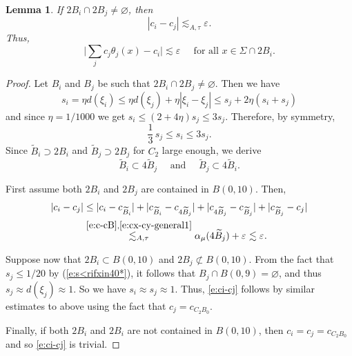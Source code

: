 \documentclass[11pt]{amsart}
\newcommand{\rf}[1]{{(\ref{#1})}}
\newcommand{\ve}{{\varepsilon}}
\newcommand{\wt}[1]{{\widetilde{#1}}}
\newtheorem{lemma}[theorem]{Lemma}
\theoremstyle{definition}
\theoremstyle{remark}
\numberwithin{equation}{section}
\def\lec{\lesssim}
\def\lec{\lesssim}
\begin{document}
\begin{lemma}
	If $2B_{i}\cap 2B_{j}\neq\varnothing$, then
	\begin{equation}
	\label{e:ci-cj}
	|c_{i}-c_{j}|\lec_{A,\tau} \ve^{}.
	\end{equation}
	Thus,
	\begin{equation}\label{e:almost-constant}
	\biggl|\sum_{j}c_{j} \theta_{j}(x)-c_{i}\biggr|\lec \ve^{} \quad\mbox{ for all }x\in \Sigma\cap 2B_{i}. 
	\end{equation}
\end{lemma}

\begin{proof}
Let $B_i$ and $B_j$ be such that $2B_{i}\cap 2B_{j}\neq\varnothing$.
 Then we have
\[
s_{i} = \eta d(\xi_{i}) \leq \eta d(\xi_{j}) + \eta|\xi_{i}-\xi_{j}|
\leq s_{j} + 2\eta (s_{i}+s_{j})
\]
and since $\eta=1/1000$ we get
$
s_{i}\leq (2+4\eta)s_{j} \leq 3s_{j}.
$
Therefore, by symmetry,
$$\frac13\,s_j\leq s_{i}\leq 3s_{j}.$$
Since $ \wt{B}_{i}\supset 2B_i$ and $\wt{B}_{j}\supset 2B_{j}$ for $C_{2}$ large enough, we
derive
\[
 \wt{B}_{i}\subset 4 \wt{B}_{j}\quad \mbox{ and }\quad\wt{B}_{j}\subset 4 \wt{B}_{i}.
\]

First assume both $2B_{i}$ and $2B_{j}$ are contained in $B(0,10)$.
Then,
\begin{align*}
|c_{i}-c_{j}|
& \leq |c_{i} - c_{\wt{B}_{i}}|
+ |c_{\wt{B}_{i}}- c_{4\wt{B}_{j}}|
+|c_{4\wt{B}_{j}}-c_{\wt{B}_{j}}|
+ |c_{\wt{B}_{j}}-c_{j}|\\
& \stackrel{\eqref{e:c-cB}, \eqref{e:cx-cy-general1}}{\lec_{A,\tau}} \alpha_{\mu}(4\wt{B}_{j}) +\ve^{} \lec \ve^{}.
\end{align*}

Suppose now that $2B_{i}\subset  B(0,10)$ and $2B_{j}\not\subset B(0,10)$.
From the fact that $s_j\leq 1/20$ by \rf{e:s<rifxin40*}, it follows that $B_j\cap B(0,9)=\varnothing$,
and thus $s_j\approx d(\xi_j)\approx 1$.
So  we have $s_{i}\approx s_{j}\approx 1$.
 Thus, \eqref{e:ci-cj} follows by similar estimates to above using the fact that $c_{j}=c_{C_{2}B_{0}}$. 
 
 Finally, if both $2B_{i}$ and $ 2B_{i}$ are not contained in $B(0,10)$, then $c_{i}=c_{j}= c_{C_{2} B_{0}}$ and so \eqref{e:ci-cj} is trivial. 
\end{proof}
%
\end{document}
